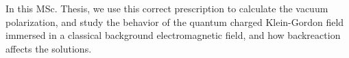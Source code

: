 In this MSc. Thesis, we use this correct prescription to calculate the vacuum polarization, and study the behavior of the quantum charged Klein-Gordon field immersed in a classical background electromagnetic field, and how backreaction affects the solutions.

%
%
